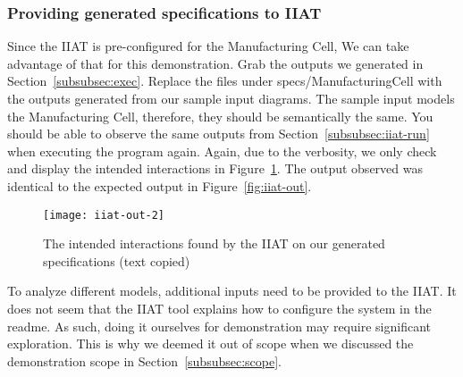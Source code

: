 \subsubsection{Providing generated specifications to IIAT}
Since the IIAT is pre-configured for the Manufacturing Cell,
We can take advantage of that for this demonstration.
Grab the outputs we generated in Section~\ref{subsubsec:exec}.
Replace the files under specs/ManufacturingCell with the outputs generated from our sample input diagrams.
The sample input models the Manufacturing Cell, therefore, they should be semantically the same.
You should be able to observe the same outputs from Section~\ref{subsubsec:iiat-run} when executing the program again.
Again, due to the verbosity, we only check and display the intended interactions in Figure~\ref{fig:iiat-out2}.
The output observed was identical to the expected output in Figure~\ref{fig:iiat-out}.
\begin{figure}[ht]
    \centering
    \texttt{[image: iiat-out-2]}
    \caption{The intended interactions found by the IIAT on our generated specifications (text copied)}
    \label{fig:iiat-out2}
\end{figure}
To analyze different models, additional inputs need to be provided to the IIAT\@.
It does not seem that the IIAT tool explains how to configure the system in the readme.
As such, doing it ourselves for demonstration may require significant exploration.
This is why we deemed it out of scope when we discussed the demonstration scope in Section~\ref{subsubsec:scope}.